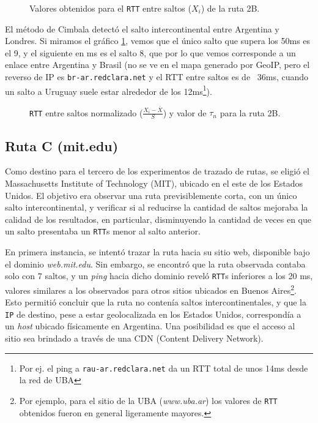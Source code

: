 \begin{figure}[H]
    \caption{Valores obtenidos para el \texttt{RTT} entre saltos ($X_i$) de la ruta 2B.}
    \label{res:escb2:rtt}
\end{figure}

El método de Cimbala detectó el salto intercontinental entre Argentina y Londres. Si miramos el gráfico \ref{res:escb2:rtt}, vemos que el único salto que supera los 50ms es el 9, y el siguiente en ms es el salto 8, que por lo que vemos corresponde a un enlace entre Argentina y Brasil (no se ve en el mapa generado por GeoIP, pero el reverso de IP es \texttt{br-ar.redclara.net} y el RTT entre saltos es de ~36ms, cuando un salto a Uruguay suele estar alrededor de los 12ms\footnote{Por ej. el ping a \texttt{rau-ar.redclara.net} da un RTT total de unos 14ms desde la red de UBA}).

\begin{figure}[H]
    \caption{\texttt{RTT} entre saltos normalizado ($\frac{X_i-\bar{X}}{S}$)
    y valor de $\tau_n$ para la ruta 2B.}
    \label{res:escb2:rttnorm}
\end{figure}

\subsection{Ruta C (mit.edu)}

Como destino para el tercero de los experimentos de trazado de rutas, se
eligió el Massachusetts Institute of Technology (MIT), ubicado en el este de
los Estados Unidos. El objetivo era observar una ruta previsiblemente corta,
con un único salto intercontinental, y verificar si al reducirse la cantidad
de saltos mejoraba la calidad de los resultados, en particular, disminuyendo
la cantidad de veces en que un salto presentaba un \texttt{RTT}s menor al
salto anterior.

En primera instancia, se intentó trazar la ruta hacia su
sitio web, disponible bajo el dominio \emph{web.mit.edu}. Sin embargo, se
encontró que la ruta observada contaba solo con 7 saltos, y un \emph{ping}
hacia dicho dominio reveló \texttt{RTT}s inferiores a los 20 ms, valores
similares a los observados para otros sitios ubicados en Buenos
Aires\footnote{Por ejemplo, para el sitio de la UBA (\emph{www.uba.ar}) los
valores de \texttt{RTT} obtenidos fueron en general ligeramente mayores.}.
Esto permitió concluir que la ruta no contenía saltos intercontinentales, y
que la \texttt{IP} de destino, pese a estar geolocalizada en los Estados
Unidos, correspondía a un \emph{host} ubicado físicamente en Argentina. Una
posibilidad es que el acceso al sitio sea brindado a través de una CDN
(Content Delivery Network).

